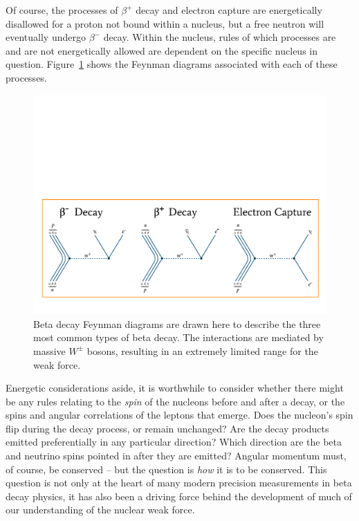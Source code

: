 Of course, the processes of $\beta^+$ decay and electron capture are energetically disallowed for a proton not bound within a nucleus, but a free neutron will eventually undergo $\beta^-$ decay.  
Within the nucleus, rules of which processes are and are not energetically allowed are dependent on the specific nucleus in question.  Figure~\ref{fig:feynmandiagrams_betadecay} shows the Feynman diagrams associated with each of these processes.   
\begin{figure}[h!t!b!]
	\centering
	\includegraphics[width=1.0\linewidth]{Figures/BetaDecayFeynmanDiagrams.pdf}
	\caption[Beta Decay Feynman Diagrams]{Beta decay Feynman diagrams are drawn here to describe the three most common types of beta decay.  The interactions are mediated by massive $W^\pm$ bosons, resulting in an extremely limited range for the weak force.
	}	
	\label{fig:feynmandiagrams_betadecay}
\end{figure}

Energetic considerations aside, it is worthwhile to consider whether there might be any rules relating to the \emph{spin} of the nucleons before and after a decay, or the spins and angular correlations of the leptons that emerge.  Does the nucleon's spin flip during the decay process, or remain unchanged?  Are the decay products emitted preferentially in any particular direction?  Which direction are the beta and neutrino spins pointed in after they are emitted?  Angular momentum must, of course, be conserved -- but the question is \emph{how} it is to be conserved.  This question is not only at the heart of many modern precision measurements in beta decay physics, it has also been a driving force behind the development of much of our understanding of the nuclear weak force.

